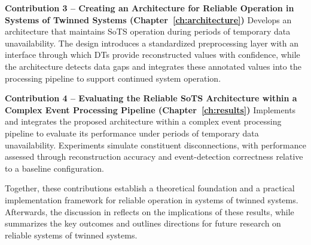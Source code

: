 \textbf{Contribution 3 – Creating an Architecture for Reliable Operation in Systems of Twinned Systems (Chapter~\ref{ch:architecture})}  
Develops an architecture that maintains SoTS operation during periods of temporary data unavailability. The design introduces a standardized preprocessing layer with an interface through which DTs provide reconstructed values with confidence, while the architecture detects data gaps and integrates these annotated values into the processing pipeline to support continued system operation.

\textbf{Contribution 4 – Evaluating the Reliable SoTS Architecture within a Complex Event Processing Pipeline (Chapter~\ref{ch:results})}  
Implements and integrates the proposed architecture within a complex event processing pipeline to evaluate its performance under periods of temporary data unavailability. Experiments simulate constituent disconnections, with performance assessed through reconstruction accuracy and event-detection correctness relative to a baseline configuration.

\vspace{1em}
\noindent 
Together, these contributions establish a theoretical foundation and a practical implementation framework for reliable operation in systems of twinned systems. Afterwards, the discussion in  reflects on the implications of these results, while  summarizes the key outcomes and outlines directions for future research on reliable systems of twinned systems.